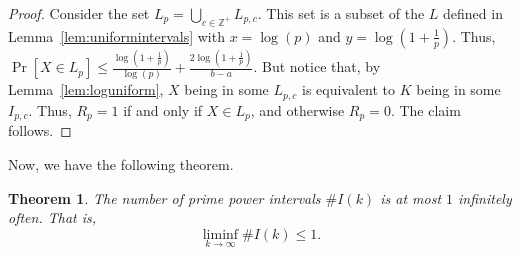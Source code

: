 \documentclass{article}
\newcommand{\Z}{\mathbb{Z}}
\newtheorem{theorem}{Theorem}[section]
\theoremstyle{definition}
\theoremstyle{remark}
\numberwithin{equation}{section}
\numberwithin{case}{theorem}
\begin{document}
\begin{proof}
    Consider the set $L_p = \bigcup_{c \in \Z^+} L_{p,c}$. This set is a subset of the $L$ defined in Lemma~\ref{lem:uniformintervals} with $x = \log(p)$ and $y = \log\left(1 + \frac{1}{p}\right)$. Thus, $\Pr[X \in L_p] \leq \frac{\log\left(1 + \frac{1}{p}\right)}{\log(p)} + \frac{2\log\left(1 + \frac{1}{p}\right)}{b - a}$. But notice that, by Lemma~\ref{lem:loguniform}, $X$ being in some $L_{p, c}$ is equivalent to $K$ being in some $I_{p, c}$. Thus, $R_p = 1$ if and only if $X \in L_p$, and otherwise $R_p = 0$. The claim follows.
\end{proof}

Now, we have the following theorem.
\begin{theorem}
    The number of prime power intervals $\#I(k)$ is at most $1$ infinitely often. That is,
    \[
        \liminf_{k \to \infty} \#I(k) \leq 1.
    \]
\end{theorem}
\end{document}

